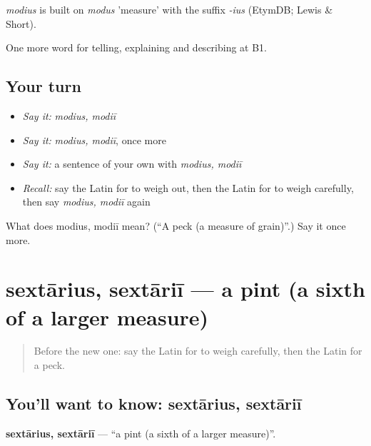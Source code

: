 \begin{cousinweb}
\emph{modius} is built on \emph{modus} 'measure' with the suffix \emph{-ius} (EtymDB; Lewis \& Short).
\end{cousinweb}

\begin{grammarlens}[title={What you've built}]
One more word for telling, explaining and describing at B1.
\end{grammarlens}

\subsection*{Your turn}
\begin{itemize}
\raggedright
  \item \emph{Say it:} \emph{modius, modiī}
  \item \emph{Say it:} \emph{modius, modiī}, once more
  \item \emph{Say it:} a sentence of your own with \emph{modius, modiī}
  \item \emph{Recall:} say the Latin for to weigh out, then the Latin for to weigh carefully, then say \emph{modius, modiī} again
\end{itemize}

\begin{tcolorbox}[breakable,colback=teal!4,colframe=teal!35!black,title={Before you move on}]
What does modius, modiī mean? (\textquotedblleft{}A peck (a measure of grain)\textquotedblright{}.) Say it once more.
\end{tcolorbox}
\section[sextārius, sextāriī]{sextārius, sextāriī — a pint (a sixth of a larger measure)}

\label{lesson:LA-C465-sextarius}



\begin{quote}
Before the new one: say the Latin for to weigh carefully, then the Latin for a peck.
\end{quote}

\subsection*{You'll want to know: sextārius, sextāriī}
\textbf{sextārius, sextāriī} — \textquotedblleft{}a pint (a sixth of a larger measure)\textquotedblright{}.

